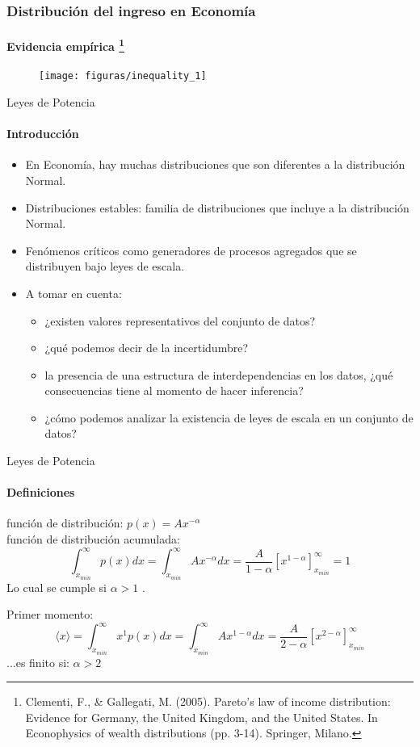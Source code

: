 \documentclass[11pt]{beamer}
\begin{document}
\begin{frame}
\frametitle{Distribución del ingreso en Economía}
\framesubtitle{Evidencia empírica \footnote{\scriptsize{ Clementi, F., \& Gallegati, M. (2005). Pareto’s law of income distribution: Evidence for Germany, the United Kingdom, and the United States. In Econophysics of wealth distributions (pp. 3-14). Springer, Milano.}}}
\begin{figure}
	\centering
	\texttt{[image: figuras/inequality\_1]}
	\label{fig:inequality1}
\end{figure}
\end{frame}

\begin{frame}{Leyes de Potencia}
\framesubtitle{Introducción}
\begin{itemize}
    \item En Economía, hay muchas distribuciones que son diferentes a la distribución Normal.
    \item Distribuciones estables: familia de distribuciones que incluye a la distribución Normal.
    \item Fenómenos críticos como generadores de procesos agregados que se distribuyen bajo leyes de escala.
    \item A tomar en cuenta:
    \begin{itemize}
        \item ¿existen valores representativos del conjunto de datos?
        \item ¿qué podemos decir de la incertidumbre?
        \item la presencia de una estructura de interdependencias en los datos, ¿qué consecuencias tiene al momento de hacer inferencia?
        \item ¿cómo podemos analizar la existencia de leyes de escala en un conjunto de datos?
    \end{itemize}
\end{itemize}
\end{frame}

\begin{frame}{Leyes de Potencia}
\framesubtitle{Definiciones}
función de distribución: $p(x)=Ax^{-\alpha}$\\
\vspace{0.5cm}
función de distribución acumulada:
\begin{equation*}
\int_{x_{min}}^{\infty} p(x)dx=\int_{x_{min}}^{\infty}Ax^{-\alpha}dx=\dfrac{A}{1-\alpha}\left[x^{1-\alpha}\right] _{x_{min}}^{\infty}=1
\end{equation*}
Lo cual se cumple si \color{blue} \textbf{$\alpha > 1$ } \color{black}.\\
\vspace{0.5cm}

Primer momento:
\begin{equation*}
\langle x \rangle = \int_{x_{min}}^{\infty} x^{1}p(x)dx=\int_{x_{min}}^{\infty}Ax^{1-\alpha}dx=\dfrac{A}{2-\alpha}\left[x^{2-\alpha}\right] _{x_{min}}^{\infty}
\end{equation*}
...es finito si: \pause \color{blue} \textbf{$\alpha > 2$ } \color{black}
\end{frame}
\end{document}
